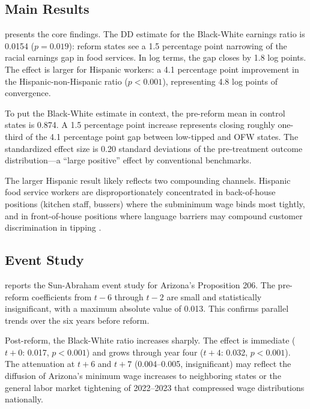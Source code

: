 \documentclass[12pt]{article}
\begin{document}
\subsection{Main Results}



 presents the core findings. The DD estimate for the Black-White earnings ratio is 0.0154 ($p = 0.019$): reform states see a 1.5 percentage point narrowing of the racial earnings gap in food services. In log terms, the gap closes by 1.8 log points. The effect is larger for Hispanic workers: a 4.1 percentage point improvement in the Hispanic-non-Hispanic ratio ($p < 0.001$), representing 4.8 log points of convergence.

To put the Black-White estimate in context, the pre-reform mean in control states is 0.874. A 1.5 percentage point increase represents closing roughly one-third of the 4.1 percentage point gap between low-tipped and OFW states. The standardized effect size is 0.20 standard deviations of the pre-treatment outcome distribution---a ``large positive'' effect by conventional benchmarks.

The larger Hispanic result likely reflects two compounding channels. Hispanic food service workers are disproportionately concentrated in back-of-house positions (kitchen staff, bussers) where the subminimum wage binds most tightly, and in front-of-house positions where language barriers may compound customer discrimination in tipping \citep{lynn2008tipping}.

\subsection{Event Study}



 reports the Sun-Abraham event study for Arizona's Proposition 206. The pre-reform coefficients from $t-6$ through $t-2$ are small and statistically insignificant, with a maximum absolute value of 0.013. This confirms parallel trends over the six years before reform.

Post-reform, the Black-White ratio increases sharply. The effect is immediate ($t+0$: 0.017, $p < 0.001$) and grows through year four ($t+4$: 0.032, $p < 0.001$). The attenuation at $t+6$ and $t+7$ (0.004--0.005, insignificant) may reflect the diffusion of Arizona's minimum wage increases to neighboring states or the general labor market tightening of 2022--2023 that compressed wage distributions nationally.
\end{document}
